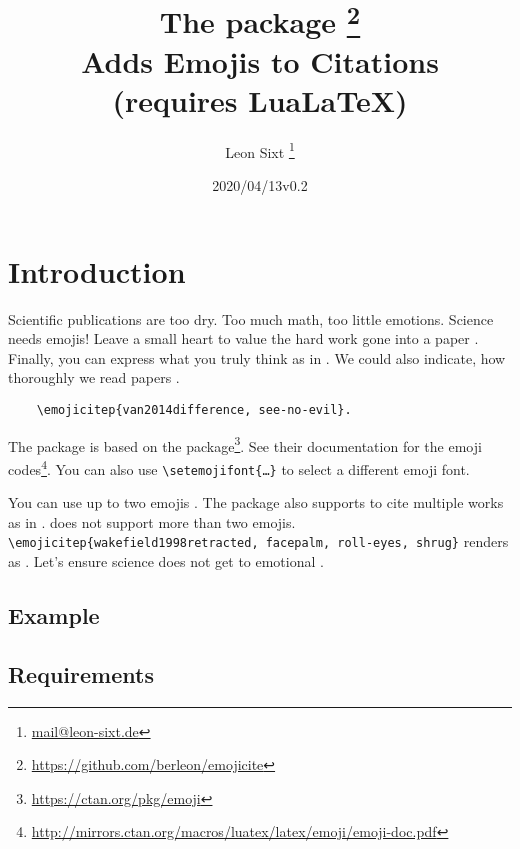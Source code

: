 \documentclass{l3doc}
\title{The \pkg{emojicite} package \thanks{\url{https://github.com/berleon/emojicite}} \\
  Adds Emojis to Citations \\
  \normalsize (requires Lua\LaTeX)}
\author{Leon Sixt \thanks{\url{mail@leon-sixt.de}}}
\date{\emoji{date} 2020/04/13\quad v0.2}
\begin{document}
\maketitle

\tableofcontents

\setlength{\parskip}{0.5em}

\section{Introduction}

Scientific publications are too dry. Too much math, too little emotions. Science
needs emojis!
Leave a small heart to value the hard work gone into a paper .
Finally, you can express what you truly think as in .
We could also indicate, how thoroughly we read papers .

\begin{verbatim}
    \emojicitep{van2014difference, see-no-evil}.
\end{verbatim}


The package is based on the  package\footnote{\url{https://ctan.org/pkg/emoji}}.
See their documentation for the emoji codes\footnote{\url{http://mirrors.ctan.org/macros/luatex/latex/emoji/emoji-doc.pdf}}. You can also use \texttt{\textbackslash setemojifont\{\dots\}} to select a different emoji font.


You can use up to two emojis . The package also supports
to cite multiple works as in .
 does not support more than two emojis.
\texttt{\textbackslash emojicitep\{wakefield1998retracted, facepalm, roll-eyes, shrug\}}
renders as .
Let's ensure science does not get to emotional .

\newpage
\subsection{Example}


\subsection{Requirements}
\end{document}

